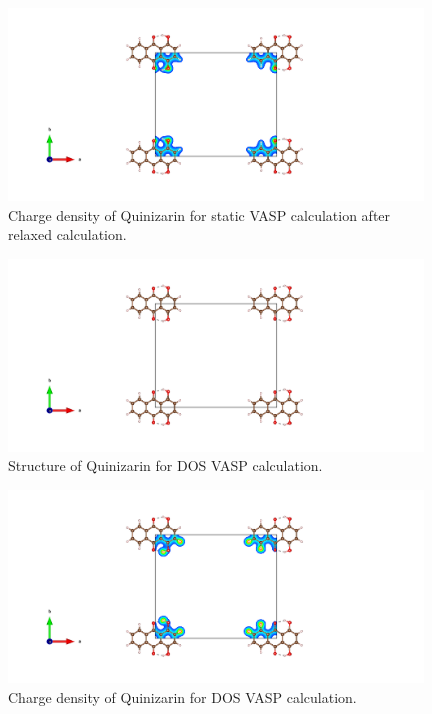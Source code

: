 \documentclass{article}
\begin{document}
  \begin{figure}[H]
      \centering
      \includegraphics[width = 11cm]{../fig/basic_staticafter_CHGCAR.png}
      \caption{Charge density of Quinizarin for static VASP calculation after relaxed calculation. }
      \label{fig:basic_staticafter_CHGCAR}
  \end{figure}

  \begin{figure}[H]
      \centering
      \includegraphics[width = 11cm]{../fig/basic_DOS_CONTCAR.png}
      \caption{Structure of Quinizarin for DOS VASP calculation. }
      \label{fig:basic_DOS_CONTCAR}
  \end{figure}

  \begin{figure}[H]
      \centering
      \includegraphics[width = 11cm]{../fig/basic_DOS_CHGCAR.png}
      \caption{Charge density of Quinizarin for DOS VASP calculation. }
      \label{fig:basic_DOS_CHGCAR}
  \end{figure}
\end{document}
